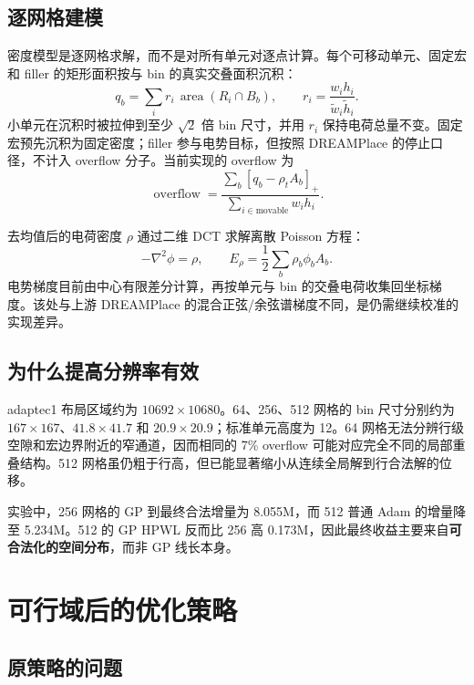 \documentclass[11pt,a4paper]{ctexart}
\newcommand{\ov}{\operatorname{overflow}}
\begin{document}
\subsection{逐网格建模}

密度模型是逐网格求解，而不是对所有单元对逐点计算。每个可移动单元、固定宏和 filler 的矩形面积按与 bin 的真实交叠面积沉积：
\begin{equation}
  q_b=\sum_i r_i\,\operatorname{area}(R_i\cap B_b),
  \qquad
  r_i=\frac{w_i h_i}{\widetilde w_i\widetilde h_i}.
\end{equation}
小单元在沉积时被拉伸到至少 $\sqrt 2$ 倍 bin 尺寸，并用 $r_i$ 保持电荷总量不变。固定宏预先沉积为固定密度；filler 参与电势目标，但按照 DREAMPlace 的停止口径，不计入 overflow 分子。当前实现的 overflow 为
\begin{equation}
  \ov=\frac{\sum_b\left[q_b-\rho_t A_b\right]_+}
  {\sum_{i\in\text{movable}}w_i h_i}.
\end{equation}

去均值后的电荷密度 $\rho$ 通过二维 DCT 求解离散 Poisson 方程：
\begin{equation}
 -\nabla^2\phi=\rho,\qquad
 E_\rho=\frac12\sum_b\rho_b\phi_b A_b.
\end{equation}
电势梯度目前由中心有限差分计算，再按单元与 bin 的交叠电荷收集回坐标梯度。该处与上游 DREAMPlace 的混合正弦/余弦谱梯度不同，是仍需继续校准的实现差异。

\subsection{为什么提高分辨率有效}

adaptec1 布局区域约为 $10692\times10680$。64、256、512 网格的 bin 尺寸分别约为 $167\times167$、$41.8\times41.7$ 和 $20.9\times20.9$；标准单元高度为 12。64 网格无法分辨行级空隙和宏边界附近的窄通道，因而相同的 7\% overflow 可能对应完全不同的局部重叠结构。512 网格虽仍粗于行高，但已能显著缩小从连续全局解到行合法解的位移。

实验中，256 网格的 GP 到最终合法增量为 8.055M，而 512 普通 Adam 的增量降至 5.234M。512 的 GP HPWL 反而比 256 高 0.173M，因此最终收益主要来自\textbf{可合法化的空间分布}，而非 GP 线长本身。

\section{可行域后的优化策略}

\subsection{原策略的问题}
\end{document}
